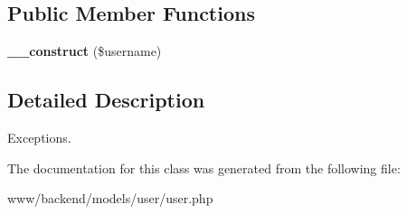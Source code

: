 \subsection*{Public Member Functions}
\begin{DoxyCompactItemize}
\item 
\hypertarget{classUserNotFoundException_a356015a1765e4c30fdc37733d7e971ce}{
{\bfseries \_\-\_\-construct} (\$username)}
\label{classUserNotFoundException_a356015a1765e4c30fdc37733d7e971ce}

\end{DoxyCompactItemize}


\subsection{Detailed Description}
Exceptions. 

The documentation for this class was generated from the following file:\begin{DoxyCompactItemize}
\item 
www/backend/models/user/user.php\end{DoxyCompactItemize}

